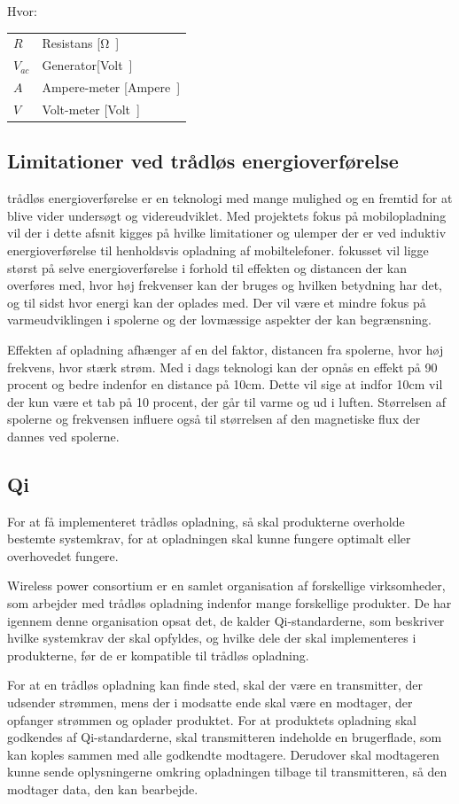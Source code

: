 Hvor:
\begin{table}[H]
	\begin{tabular}{l|l}
	$R$     & Resistans [\si \ohm] \\
	$V_{ac}$ 	   &  Generator[\si Volt] \\
	$A$ 	   & Ampere-meter [\si Ampere] \\
	$V$			& Volt-meter [\si Volt]
	\end{tabular}
\end{table}

\subsection{Limitationer ved trådløs energioverførelse }
trådløs energioverførelse er en teknologi med mange mulighed og en fremtid for at blive vider undersøgt og  videreudviklet. Med projektets fokus på mobilopladning vil der i dette afsnit kigges på hvilke limitationer og ulemper der er ved induktiv energioverførelse til henholdsvis opladning af mobiltelefoner. fokusset vil ligge størst på selve energioverførelse i forhold til effekten og distancen der kan overføres med, hvor høj frekvenser kan der bruges og hvilken betydning har det, og til sidst hvor energi kan der oplades med. Der vil være et mindre fokus på varmeudviklingen i spolerne og der lovmæssige aspekter der kan begrænsning.

Effekten af opladning afhænger af en del faktor, distancen fra spolerne, hvor høj frekvens, hvor stærk strøm. Med i dags teknologi kan der opnås en effekt på 90 procent og bedre indenfor en distance på 10cm. Dette vil sige at indfor 10cm vil der kun være et tab på 10 procent, der går til varme og ud i luften. Størrelsen af spolerne og frekvensen influere også til størrelsen af den magnetiske flux der dannes ved spolerne.

\subsection{Qi}
For at få implementeret trådløs opladning, så skal produkterne overholde bestemte systemkrav, for at opladningen skal kunne fungere optimalt eller overhovedet fungere.

Wireless power consortium er en samlet organisation af forskellige virksomheder, som arbejder med trådløs opladning indenfor mange forskellige produkter. De har igennem denne organisation opsat det, de kalder Qi-standarderne, som beskriver hvilke systemkrav der skal opfyldes, og hvilke dele der skal implementeres i produkterne, før de er kompatible til trådløs opladning.

For at en trådløs opladning kan finde sted, skal der være en transmitter, der udsender strømmen, mens der i modsatte ende skal være en modtager, der opfanger strømmen og oplader produktet. For at produktets opladning skal godkendes af Qi-standarderne, skal transmitteren indeholde en brugerflade, som kan koples sammen med alle godkendte modtagere. Derudover skal modtageren kunne sende oplysningerne omkring opladningen tilbage til transmitteren, så den modtager data, den kan bearbejde.
